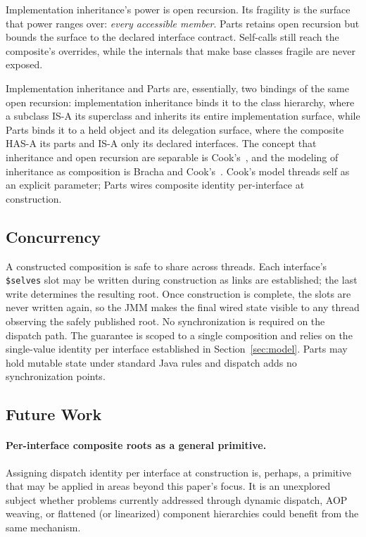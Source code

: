 \documentclass[acmsmall,nonacm]{acmart}
\theoremstyle{acmplain}
\newcommand{\code}[1]{\texttt{#1}}
\begin{document}
Implementation inheritance's power is open recursion. Its fragility is the surface that power ranges over: \emph{every accessible
member}. Parts retains open recursion but bounds the surface to the declared interface contract. Self-calls still reach the
composite's overrides, while the internals that make base classes fragile are never exposed.

Implementation inheritance and Parts are, essentially, two bindings of the same open recursion: implementation inheritance
binds it to the class hierarchy, where a subclass IS-A its superclass and inherits its entire implementation surface, while
Parts binds it to a held object and its delegation surface, where the composite HAS-A its parts and IS-A only its declared interfaces.
The concept that inheritance and open recursion are separable is Cook's~\cite{cookpalsberg1989,cook1990}, and the modeling
of inheritance as composition is Bracha and Cook's~\cite{bracha1990}. Cook's model threads self as an explicit parameter;
Parts wires composite identity per-interface at construction.

\subsection{Concurrency}

A constructed composition is safe to share across threads. Each interface's \code{\$selves} slot may be written during construction
as links are established; the last write determines the resulting root. Once construction is complete, the slots are never
written again, so the JMM makes the final wired state visible to any thread observing the safely published root. No synchronization
is required on the dispatch path. The guarantee is scoped to a single composition and relies on the single-value identity
per interface established in Section~\ref{sec:model}. Parts may hold mutable state under standard Java rules and dispatch
adds no synchronization points.

\subsection{Future Work}
\label{sec:futurework}

\paragraph{Per-interface composite roots as a general primitive.}
Assigning dispatch identity per interface at construction is, perhaps, a primitive that may be applied in areas beyond this
paper's focus. It is an unexplored subject whether problems currently addressed through dynamic dispatch, AOP weaving, or
flattened (or linearized) component hierarchies could benefit from the same mechanism.
\end{document}
